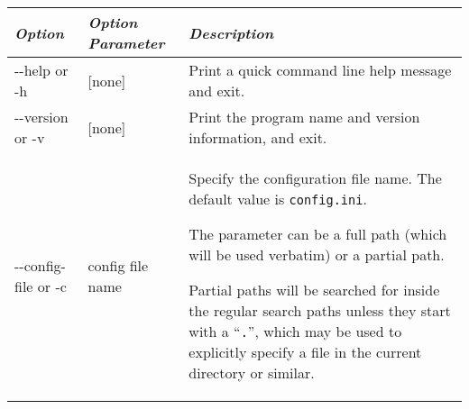 \begin{longtabu} to \textwidth {l|l|X}
\toprule
\emph{Option} & \emph{Option Parameter} & \emph{Description}\tabularnewline
\midrule
-\/-help or -h & {[}none{]} & Print a quick command line help message
and exit. \tabularnewline
\midrule
-\/-version or -v & {[}none{]} & Print the program name and version
information, and exit. \tabularnewline
\midrule
-\/-config-file or -c & config file name & Specify the configuration
file name. The default value is \texttt{config.ini}.

The parameter can be a full path (which will be used verbatim) or a
partial path.

Partial paths will be searched for inside the regular search paths
unless they start with a ``\texttt{.}'', which may be used to explicitly
specify a file in the current directory or similar.


\end{longtabu}
